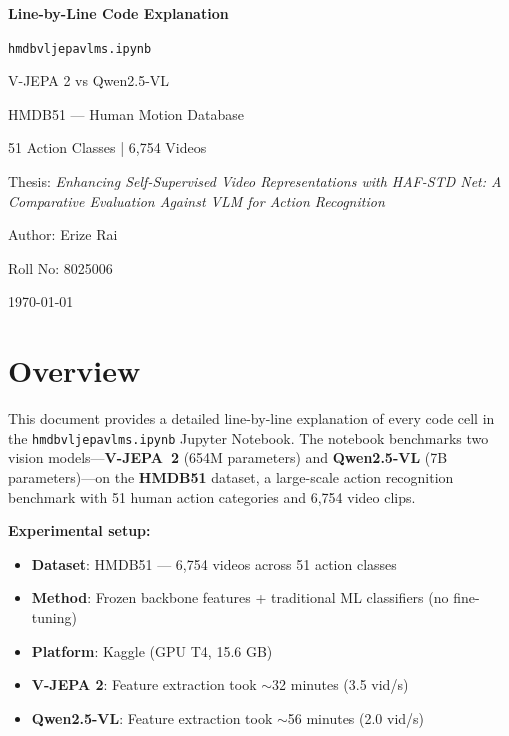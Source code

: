 \documentclass[a4paper, 12pt]{article}
\begin{document}
\begin{titlepage}
\centering
\vspace*{3cm}
{\Huge\bfseries Line-by-Line Code Explanation\par}
\vspace{0.8cm}
{\LARGE\texttt{hmdbvljepavlms.ipynb}\par}
\vspace{1.5cm}
{\Large V-JEPA 2 vs Qwen2.5-VL\par}
{\Large HMDB51 --- Human Motion Database\par}
\vspace{1cm}
{\large 51 Action Classes | 6,754 Videos\par}
\vspace{2cm}
{\large Thesis: \textit{Enhancing Self-Supervised Video Representations with HAF-STD Net: A Comparative Evaluation Against VLM for Action Recognition}\par}
\vspace{1cm}
{\large Author: Erize Rai\par}
{\large Roll No: 8025006\par}
\vfill
{\large\today\par}
\end{titlepage}

\tableofcontents
\newpage

\section{Overview}

This document provides a detailed line-by-line explanation of every code cell in the \texttt{hmdbvljepavlms.ipynb} Jupyter Notebook. The notebook benchmarks two vision models---\textbf{V-JEPA~2} (654M parameters) and \textbf{Qwen2.5-VL} (7B parameters)---on the \textbf{HMDB51} dataset, a large-scale action recognition benchmark with 51 human action categories and 6,754 video clips.

\textbf{Experimental setup:}
\begin{itemize}[nosep]
  \item \textbf{Dataset}: HMDB51 --- 6,754 videos across 51 action classes
  \item \textbf{Method}: Frozen backbone features + traditional ML classifiers (no fine-tuning)
  \item \textbf{Platform}: Kaggle (GPU T4, 15.6 GB)
  \item \textbf{V-JEPA 2}: Feature extraction took $\sim$32 minutes (3.5 vid/s)
  \item \textbf{Qwen2.5-VL}: Feature extraction took $\sim$56 minutes (2.0 vid/s)
\end{itemize}
\end{document}
